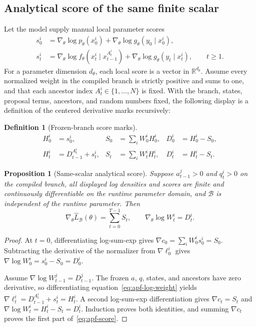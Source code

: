 \documentclass[11pt]{article}
\newtheorem{proposition}{Proposition}
\newtheorem{definition}{Definition}
\begin{document}
\subsection{Analytical score of the same finite scalar}

Let the model supply manual local parameter scores
\begin{align}
s_0^i&=\nabla_\theta\log p_\theta(x_0^i)
       +\nabla_\theta\log g_\theta(y_0\mid x_0^i),\\
s_t^i&=\nabla_\theta\log f_\theta(x_t^i\mid x_{t-1}^{A_t^i})
       +\nabla_\theta\log g_\theta(y_t\mid x_t^i),\qquad t\geq1.
\end{align}
For a parameter dimension $d_\theta$, each local score is a vector in
$\mathbb R^{d_\theta}$. Assume every normalized weight in the compiled branch
is strictly positive and sums to one, and that each ancestor index
$A_t^i\in\{1,\ldots,N\}$ is fixed. With the branch, states, proposal terms,
ancestors, and random numbers fixed, the following display is a definition of
the centered derivative marks recursively:
\begin{definition}[Frozen-branch score marks]
\begin{align}
H_0^i&=s_0^i,&
S_0&=\sum_iW_0^iH_0^i,&
D_0^i&=H_0^i-S_0,\\
H_t^i&=D_{t-1}^{A_t^i}+s_t^i,&
S_t&=\sum_iW_t^iH_t^i,&
D_t^i&=H_t^i-S_t.
\label{eq:score-recursion}
\end{align}
\end{definition}

\begin{proposition}[Same-scalar analytical score]\label{prop:apf-score}
Suppose $a_{t-1}^j>0$ and $q_t^i>0$ on the compiled branch, all displayed
log densities and scores are finite and continuously differentiable on the
runtime parameter domain, and $\mathcal B$ is independent of the runtime
parameter. Then
\begin{equation}\label{eq:apf-score}
\nabla_\theta\widehat L_{\mathcal B}(\theta)
=\sum_{t=0}^{T-1}S_t,
\qquad
\nabla_\theta\log W_t^i=D_t^i.
\end{equation}
\end{proposition}

\begin{proof}
At $t=0$, differentiating log-sum-exp gives
$\nabla c_0=\sum_iW_0^is_0^i=S_0$. Subtracting the derivative of the
normalizer from $\nabla\ell_0^i$ gives
$\nabla\log W_0^i=s_0^i-S_0=D_0^i$.

Assume $\nabla\log W_{t-1}^j=D_{t-1}^j$. The frozen $a$, $q$, states, and
ancestors have zero derivative, so differentiating
equation~\eqref{eq:apf-log-weight} yields
$\nabla\ell_t^i=D_{t-1}^{A_t^i}+s_t^i=H_t^i$. A second log-sum-exp
differentiation gives $\nabla c_t=S_t$ and
$\nabla\log W_t^i=H_t^i-S_t=D_t^i$. Induction proves both identities, and
summing $\nabla c_t$ proves the first part of~\eqref{eq:apf-score}.
\end{proof}
\end{document}

